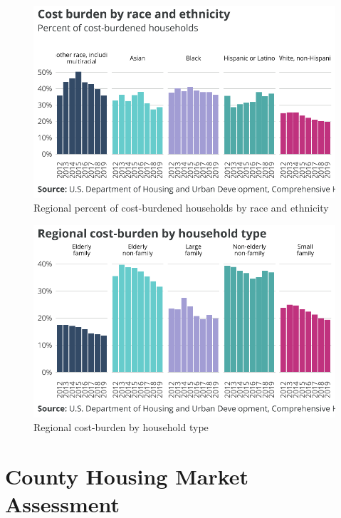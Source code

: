 \documentclass[
  letterpaper,
  DIV=11,
  numbers=noendperiod]{scrreprt}
\begin{document}
\begin{figure}[H]

{\centering \includegraphics{./part-3-1_files/figure-pdf/fig-cb-race-1.pdf}

}

\caption{\label{fig-cb-race}Regional percent of cost-burdened households
by race and ethnicity}

\end{figure}

\begin{figure}[H]

{\centering \includegraphics{./part-3-1_files/figure-pdf/fig-hh-cb-1.pdf}

}

\caption{\label{fig-hh-cb}Regional cost-burden by household type}

\end{figure}

\hypertarget{county-housing-market-assessment}{%
\chapter{County Housing Market
Assessment}\label{county-housing-market-assessment}}
\end{document}
